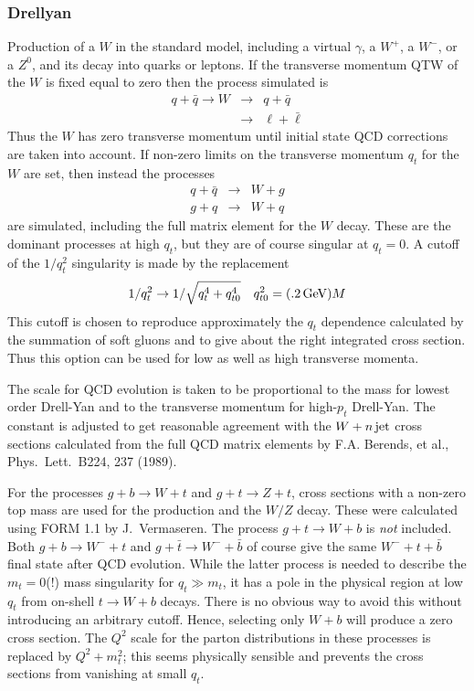 \subsubsection{Drellyan} Production of a $W$ in the standard model,
including a virtual $\gamma$, a $W^+$, a $W^-$, or a $Z^0$, and its
decay into quarks or leptons. If the transverse momentum QTW of the
$W$ is fixed equal to zero then the process simulated is
\begin{eqnarray*}
q + \bar q \to W &\to& q + \bar q \\
                 &\to& \ell + \bar\ell
\end{eqnarray*}
Thus the $W$ has zero transverse momentum until initial state QCD
corrections are taken into account. If non-zero limits on the
transverse momentum $q_t$ for the $W$ are set, then instead the
processes
\begin{eqnarray*}
q + \bar q &\to& W + g \\
g + q      &\to& W + q
\end{eqnarray*}
are simulated, including the full matrix element for the $W$ decay.
These are the dominant processes at high $q_t$, but they are of course
singular at $q_t=0$. A cutoff of the $1/q_t^2$ singularity is made by
the replacement
$$
1/q_t^2 \to 1/\sqrt{q_t^4+q_{t0}^4} \quad q_{t0}^2 =  (.2\,{\rm GeV}) M
$$
This cutoff is chosen to reproduce approximately the $q_t$ dependence
calculated by the summation of soft gluons and to give about the right
integrated cross section. Thus this option can be used for low as well
as high transverse momenta.

      The scale for QCD evolution is taken to be proportional to the
mass for lowest order Drell-Yan and to the transverse momentum for
high-$p_t$ Drell-Yan. The constant is adjusted to get reasonable
agreement with the $W + n\,{\rm jet}$ cross sections calculated from
the full QCD matrix elements by F.A. Berends, et al., Phys.\ 
Lett.\ B224, 237 (1989).

      For the processes $g + b \to W + t$ and $g + t \to Z + t$, cross
sections with a non-zero top mass are used for the production and the
$W/Z$ decay. These were calculated using FORM 1.1 by J.~Vermaseren. The
process $g + t \to W + b$ is {\it not} included. Both $g + b \to W^- +
t$ and $g + \bar t \to W^- + \bar b$ of course give the same $W^- + t
+ \bar b$ final state after QCD evolution. While the latter process is
needed to describe the $m_t = 0$(!) mass singularity for $q_t \gg
m_t$, it has a pole in the physical region at low $q_t$ from on-shell
$t \to W + b$ decays. There is no obvious way to avoid this without
introducing an arbitrary cutoff.  Hence, selecting only $W + b$ will
produce a zero cross section. The $Q^2$ scale for the parton
distributions in these processes is replaced by $Q^2 + m_t^2$; this
seems physically sensible and prevents the cross sections from
vanishing at small $q_t$.

